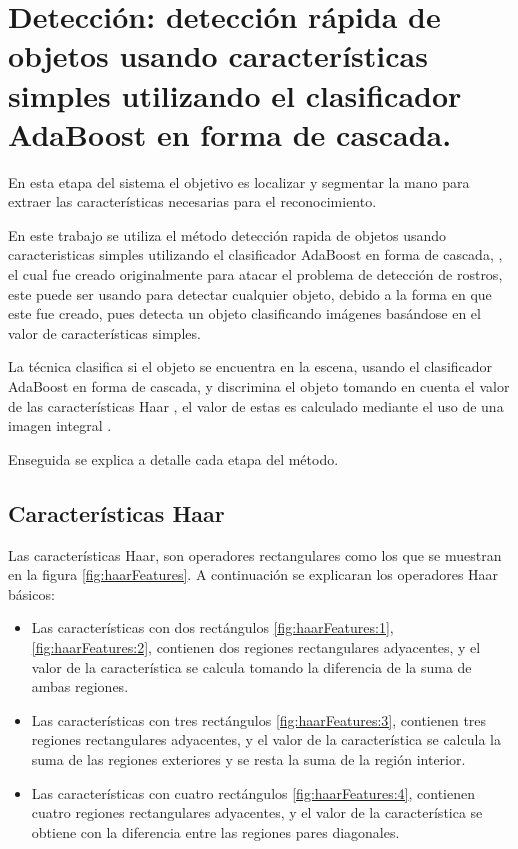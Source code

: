  
\section{Detección: detección rápida de objetos usando características simples utilizando el clasificador AdaBoost en forma de cascada.}\label{sec:ViolaJones}

En esta etapa del sistema el objetivo es localizar y segmentar la mano para extraer las características necesarias para el reconocimiento. 

En este trabajo se utiliza el método detección rapida de objetos usando caracteristicas simples utilizando el clasificador AdaBoost en forma de cascada, \citep{Viola2001}, el cual fue creado originalmente para atacar el problema de detección de rostros, este puede ser usando para detectar cualquier objeto, debido a la forma en que este fue creado, pues detecta un objeto clasificando imágenes basándose en el valor de características simples.

La técnica clasifica si el objeto se encuentra en la escena, usando el clasificador AdaBoost \citep{Freund1995} en forma de cascada, y discrimina el objeto tomando en cuenta el valor de las características Haar \citep{Viola2001}, el valor de estas es calculado mediante el uso de una imagen integral \citep{Viola2001}.

Enseguida se explica a detalle cada etapa del método. 


\subsection{Características Haar}\label{subsec:CaracteristicasHaar}  

Las características Haar, son operadores rectangulares como los que se muestran en la figura \ref{fig:haarFeatures}. A continuación se explicaran los operadores Haar básicos:
\begin{itemize}
\item Las características con dos rectángulos \ref{fig:haarFeatures:1}, \ref{fig:haarFeatures:2}, contienen dos regiones rectangulares adyacentes, y el valor de la característica se calcula tomando la diferencia de la suma de ambas regiones. 

\item Las características con tres rectángulos \ref{fig:haarFeatures:3}, contienen tres regiones rectangulares adyacentes, y el valor de la característica se calcula la suma de las regiones exteriores y se resta la suma de la región interior.

\item Las características con cuatro rectángulos \ref{fig:haarFeatures:4}, contienen cuatro regiones rectangulares adyacentes, y el valor de la característica se obtiene con la diferencia entre las regiones pares diagonales.
\end{itemize} 

